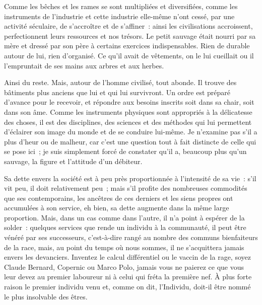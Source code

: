 \documentclass[french,twoside]{book} %
\newcommand{\astermono}{\medskip\centerline{\color{rubric}\large\selectfont{\syms ✻}}\medskip\par}%
\begin{document}
Comme les bêches et les rames se sont multipliées et diversifiées, comme les instruments de l’industrie et cette industrie elle-même n’ont cessé, par une activité séculaire, de s’accroître et de s’affiner : ainsi les civilisations accroissent, perfectionnent leurs ressources et nos trésors. Le petit sauvage était nourri par sa mère et dressé par son père à certains exercices indispensables. Rien de durable autour de lui, rien d’organisé. Ce qu’il avait de vêtements, on le lui cueillait ou il l’empruntait de ses mains aux arbres et aux herbes.\par
Ainsi du reste. Mais, autour de l’homme civilisé, tout abonde. Il trouve des bâtiments plus anciens que lui et qui lui survivront. Un ordre est préparé d’avance pour le recevoir, et répondre aux besoins inscrits soit dans sa chair, soit dans son âme. Comme les instruments physiques sont appropriés à la délicatesse des choses, il est des disciplines, des sciences et des méthodes qui lui permettent d’éclairer son image du monde et de se conduire lui-même. Je n’examine pas s’il a plus d’heur ou de malheur, car c’est une question tout à fait distincte de celle qui se pose ici ; je suis simplement forcé de constater qu’il a, beaucoup plus qu’un sauvage, la figure et l’attitude d’un débiteur.\par
Sa dette envers la société est à peu près proportionnée à l’intensité de sa vie : s’il vit peu, il doit relativement peu ; mais s’il profite des nombreuses commodités que ses contemporains, les ancêtres de ces derniers et les siens propres ont accumulées à son service, eh bien, sa dette augmente dans la même large proportion. Mais, dans un cas comme dans l’autre, il n’a point à espérer de la solder : quelques services que rende un individu à la communauté, il peut être vénéré par ses successeurs, c’est-à-dire rangé au nombre des communs bienfaiteurs de la race, mais, au point du temps où nous sommes, il ne s’acquittera jamais envers les devanciers. Inventez le calcul différentiel ou le vaccin de la rage, soyez Claude Bernard, Copernic ou Marco Polo, jamais vous ne paierez ce que vous leur devez au premier laboureur ni à celui qui fréta la première nef. À plus forte raison le premier individu venu et, comme on dit, l’Individu, doit-il être nommé le plus insolvable des êtres.\par

\astermono
\end{document}
